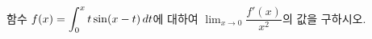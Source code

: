 함수 $f(x)=\displaystyle\int_{0}^{x}t\sin(x-t)\mkern3mu dt$에 대하여 $\displaystyle\lim_{x\to 0}\dfrac{f'(x)}{x^2}$의 값을 구하시오.
